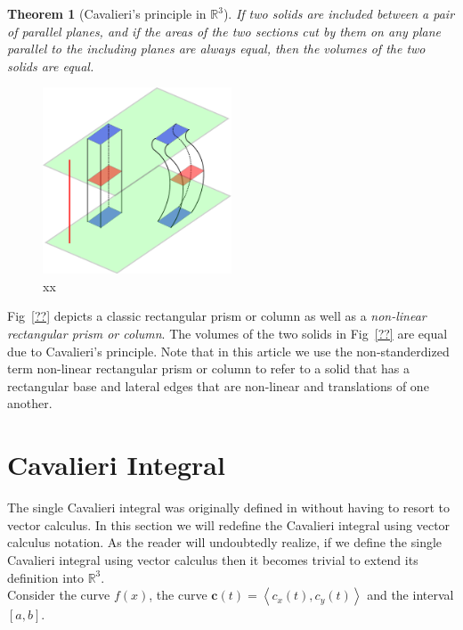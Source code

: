 \documentclass{article}
\theoremstyle{theorem}
\newtheorem{theorem}{Theorem}
\theoremstyle{definition}
\begin{document}
\begin{theorem}[Cavalieri's principle in $\mathbb{R}^3$]
If two solids are included between a pair of parallel planes, and if the areas of
the two sections cut by them on any plane parallel to the including planes are always
equal, then the volumes of the two solids are equal.
\end{theorem}

\begin{figure}[htb]
\centering
\includegraphics[width=0.5\textwidth]{cav_principle.pdf}
\caption{xx}
\label{fig:cav_principle}
\end{figure}



\noindent
Fig~\ref{??} depicts a classic rectangular prism or column as well as a \emph{non-linear rectangular prism or column}. The volumes of the two solids in Fig~\ref{??} are equal due 
to Cavalieri's principle. Note that in this article we use the non-standerdized term non-linear rectangular prism or column to refer to a solid that has a rectangular 
base and lateral edges that are non-linear and translations of one another.

\section{Cavalieri Integral}
The single Cavalieri integral was originally defined in \cite{ackermann12} without having to resort to vector calculus. In this section we will redefine the Cavalieri integral using vector calculus notation. As the reader will undoubtedly realize, if we define the single Cavalieri integral using vector calculus then it becomes trivial to
extend its definition into $\mathbb{R}^3$.\\


\noindent
Consider the curve $f(x)$, the curve $\mathbf{c}(t)=\left <c_x(t),c_y(t) \right >$ and the interval $[a,b]$.
\end{document}
